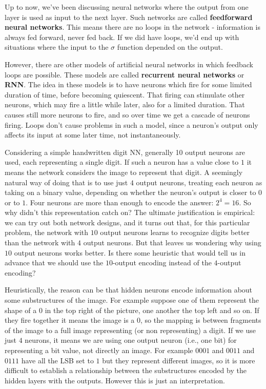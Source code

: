 \documentclass[12pt, letterpaper]{article}
\theoremstyle{definition}
\let\tb\textbf
\begin{document}
Up to now, we've been discussing neural networks where the output from one layer is used as input to the next layer. Such networks are called \tb{feedforward neural networks}. This means there are no loops in the network - information is always fed forward, never fed back. If we did have loops, we'd end up with situations where the input to the $\sigma$ function depended on the output. 

However, there are other models of artificial neural networks in which feedback loops are possible. These models are called \tb{recurrent neural networks} or \tb{RNN}. The idea in these models is to have neurons which fire for some limited duration of time, before becoming quiescent. That firing can stimulate other neurons, which may fire a little while later, also for a limited duration. That causes still more neurons to fire, and so over time we get a cascade of neurons firing. Loops don't cause problems in such a model, since a neuron's output only affects its input at some later time, not instantaneously.

Considering a simple handwritten digit NN, generally 10 output neurons are used, each representing a single digit. If such a neuron has a value close to $1$ it means the network considers the image to represent that digit. A seemingly natural way of doing that is to use just $4$ output neurons, treating each neuron as taking on a binary value, depending on whether the neuron's output is closer to $0$ or to $1$. Four neurons are more than enough to encode the answer: $2^4=16$. So why didn't this representation catch on? The ultimate justification is empirical: we can try out both network designs, and it turns out that, for this particular problem, the network with $10$ output neurons learns to recognize digits better than the network with $4$ output neurons. But that leaves us wondering why using $10$ output neurons works better. Is there some heuristic that would tell us in advance that we should use the $10$-output encoding instead of the $4$-output encoding?

Heuristically, the reason can be that hidden neurons encode information about some substructures of the image. For example suppose one of them represent the shape of a $0$ in the top right of the picture, one another the top left and so on. If they fire together it means the image is a $0$, so the mapping is between fragments of the image to a full image representing (or non representing) a digit. If we use just $4$ neurons, it means we are using one output neuron (i.e., one bit) for representing a bit value, not directly an image. For example $0001$ and $0011$ and $0111$ have all the LSB set to $1$ but they represent different images, so it is more difficult to establish a relationship between the substructures encoded by the hidden layers with the outputs. However this is just an interpretation.
\end{document}
